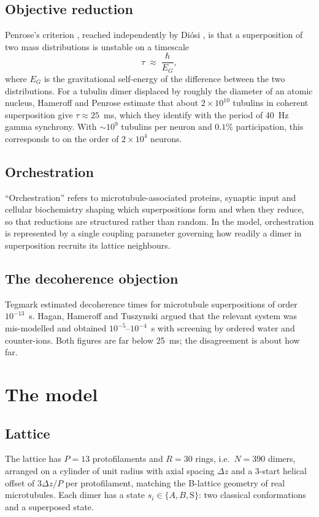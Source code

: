 \documentclass[11pt]{article}
\begin{document}
\subsection{Objective reduction}
Penrose's criterion \citep{penrose1996}, reached independently by Di\'osi \citep{diosi1989}, is that a superposition of two mass distributions is unstable on a timescale
\begin{equation}
\tau \;\approx\; \frac{\hbar}{E_G},
\label{eq:tau}
\end{equation}
where $E_G$ is the gravitational self-energy of the difference between the two distributions. For a tubulin dimer displaced by roughly the diameter of an atomic nucleus, Hameroff and Penrose \citep{hameroff2014} estimate that about $2\times10^{10}$ tubulins in coherent superposition give $\tau \approx 25$~ms, which they identify with the period of 40~Hz gamma synchrony. With $\sim10^9$ tubulins per neuron and $0.1\%$ participation, this corresponds to on the order of $2\times10^4$ neurons.

\subsection{Orchestration}
``Orchestration'' refers to microtubule-associated proteins, synaptic input and cellular biochemistry shaping which superpositions form and when they reduce, so that reductions are structured rather than random. In the model, orchestration is represented by a single coupling parameter governing how readily a dimer in superposition recruits its lattice neighbours.

\subsection{The decoherence objection}
Tegmark \citep{tegmark2000} estimated decoherence times for microtubule superpositions of order $10^{-13}$~s. Hagan, Hameroff and Tuszynski \citep{hagan2002} argued that the relevant system was mis-modelled and obtained $10^{-5}$--$10^{-4}$~s with screening by ordered water and counter-ions. Both figures are far below 25~ms; the disagreement is about how far.

\section{The model}
\subsection{Lattice}
The lattice has $P=13$ protofilaments and $R=30$ rings, i.e.\ $N=390$ dimers, arranged on a cylinder of unit radius with axial spacing $\Delta z$ and a 3-start helical offset of $3\Delta z/P$ per protofilament, matching the B-lattice geometry of real microtubules. Each dimer has a state $s_i \in \{A, B, \mathrm{S}\}$: two classical conformations and a superposed state.
\end{document}
